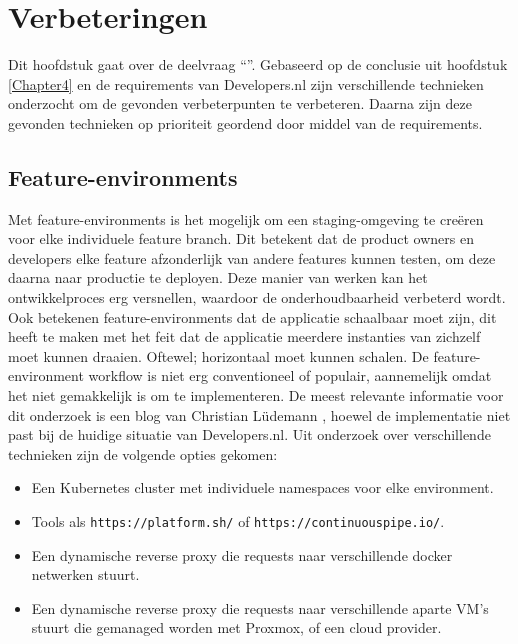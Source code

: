 \chapter{Verbeteringen}

\label{Chapter5}

Dit hoofdstuk gaat over de deelvraag \enquote{\deelverbetering}. Gebaseerd op de conclusie uit hoofdstuk \ref{Chapter4} en de requirements van Developers.nl zijn verschillende technieken onderzocht om de gevonden verbeterpunten te verbeteren. Daarna zijn deze gevonden technieken op prioriteit geordend door middel van de requirements. 

\section{Feature-environments}
\label{VerbeteringFeatureEnvironments}
Met feature-environments is het mogelijk om een staging-omgeving te creëren voor elke individuele feature branch. Dit betekent dat de product owners en developers elke feature afzonderlijk van andere features kunnen testen, om deze daarna naar productie te deployen. Deze manier van werken kan het ontwikkelproces erg versnellen, waardoor de onderhoudbaarheid verbeterd wordt. Ook betekenen feature-environments dat de applicatie schaalbaar moet zijn, dit heeft te maken met het feit dat de applicatie meerdere instanties van zichzelf moet kunnen draaien. Oftewel; horizontaal moet kunnen schalen. De feature-environment workflow is niet erg conventioneel of populair, aannemelijk omdat het niet gemakkelijk is om te implementeren. De meest relevante informatie voor dit onderzoek is een blog van Christian Lüdemann \parencite{FeatureEnvs}, hoewel de implementatie niet past bij de huidige situatie van Developers.nl. Uit onderzoek over verschillende technieken zijn de volgende opties gekomen:
\begin{itemize}
	\item Een Kubernetes cluster met individuele namespaces voor elke environment.
	\item Tools als \texttt{https://platform.sh/} of \texttt{https://continuouspipe.io/}.
	\item Een dynamische reverse proxy die requests naar verschillende docker netwerken stuurt.
	\item Een dynamische reverse proxy die requests naar verschillende aparte VM's stuurt die gemanaged worden met Proxmox, of een cloud provider.
\end{itemize}

